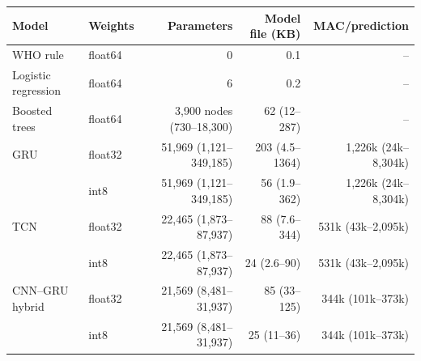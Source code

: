 \begin{tabular}{llrrr}
\toprule
Model & Weights & Parameters & Model file (KB) & MAC/prediction \\
\midrule
WHO rule & float64 & 0 & 0.1 & -- \\
Logistic regression & float64 & 6 & 0.2 & -- \\
Boosted trees & float64 & 3{,}900 nodes (730--18{,}300) & 62 (12--287) & -- \\
GRU & float32 & 51{,}969 (1{,}121--349{,}185) & 203 (4.5--1364) & 1{,}226k (24k--8{,}304k) \\
 & int8 & 51{,}969 (1{,}121--349{,}185) & 56 (1.9--362) & 1{,}226k (24k--8{,}304k) \\
TCN & float32 & 22{,}465 (1{,}873--87{,}937) & 88 (7.6--344) & 531k (43k--2{,}095k) \\
 & int8 & 22{,}465 (1{,}873--87{,}937) & 24 (2.6--90) & 531k (43k--2{,}095k) \\
CNN--GRU hybrid & float32 & 21{,}569 (8{,}481--31{,}937) & 85 (33--125) & 344k (101k--373k) \\
 & int8 & 21{,}569 (8{,}481--31{,}937) & 25 (11--36) & 344k (101k--373k) \\
\bottomrule
\end{tabular}